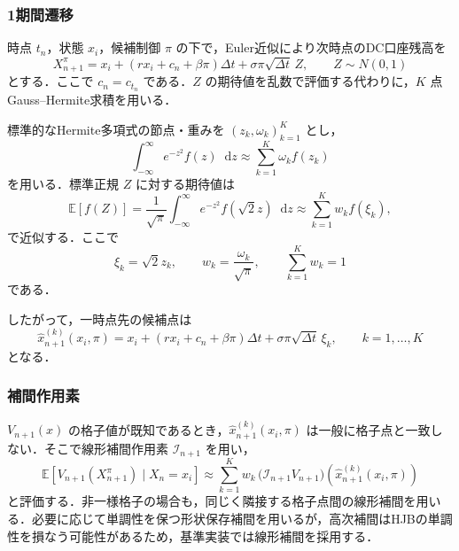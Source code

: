 \documentclass[10pt,a4paper]{article}
\theoremstyle{plain}
\theoremstyle{definition}
\newcommand{\E}{\mathbb{E}}
\newcommand{\dd}{\mathop{}\!\mathrm{d}}
\begin{document}
\subsubsection{1期間遷移}

時点 $t_n$，状態 $x_i$，候補制御 $\pi$ の下で，Euler近似により次時点のDC口座残高を
\begin{equation}
  X_{n+1}^{\pi}
  =x_i+(rx_i+c_n+\beta\pi)\Delta t+\sigma\pi\sqrt{\Delta t}\,Z,
  \qquad Z\sim N(0,1)
  \label{eq:euler-transition}
\end{equation}
とする．ここで $c_n=c_{t_n}$ である．$Z$ の期待値を乱数で評価する代わりに，$K$ 点Gauss--Hermite求積を用いる．

標準的なHermite多項式の節点・重みを $(z_k,\omega_k)_{k=1}^K$ とし，
\begin{equation}
  \int_{-\infty}^{\infty} e^{-z^2}f(z)\dd z
  \approx
  \sum_{k=1}^K\omega_k f(z_k)
  \label{eq:gh-basic}
\end{equation}
を用いる．標準正規 $Z$ に対する期待値は
\begin{equation}
  \E[f(Z)]
  =\frac{1}{\sqrt{\pi}}\int_{-\infty}^{\infty}e^{-z^2}f(\sqrt{2}z)\dd z
  \approx
  \sum_{k=1}^K w_k f(\xi_k),
  \label{eq:gh-normal}
\end{equation}
で近似する．ここで
\begin{equation}
  \xi_k=\sqrt{2}z_k,
  \qquad
  w_k=\frac{\omega_k}{\sqrt{\pi}},
  \qquad
  \sum_{k=1}^K w_k=1
  \label{eq:gh-nodes}
\end{equation}
である．

したがって，一時点先の候補点は
\begin{equation}
  \widehat{x}_{n+1}^{(k)}(x_i,\pi)
  =x_i+(rx_i+c_n+\beta\pi)\Delta t
  +\sigma\pi\sqrt{\Delta t}\,\xi_k,
  \qquad k=1,\ldots,K
  \label{eq:transition-gh-nodes}
\end{equation}
となる．

\subsubsection{補間作用素}

$V_{n+1}(x)$ の格子値が既知であるとき，$\widehat{x}_{n+1}^{(k)}(x_i,\pi)$ は一般に格子点と一致しない．そこで線形補間作用素 $\mathcal I_{n+1}$ を用い，
\begin{equation}
  \E\left[V_{n+1}(X_{n+1}^{\pi})\mid X_n=x_i\right]
  \approx
  \sum_{k=1}^K w_k\,
  \bigl(\mathcal I_{n+1}V_{n+1}\bigr)
  \left(\widehat{x}_{n+1}^{(k)}(x_i,\pi)\right)
  \label{eq:gh-expectation}
\end{equation}
と評価する．非一様格子の場合も，同じく隣接する格子点間の線形補間を用いる．必要に応じて単調性を保つ形状保存補間を用いるが，高次補間はHJBの単調性を損なう可能性があるため，基準実装では線形補間を採用する．
\end{document}
